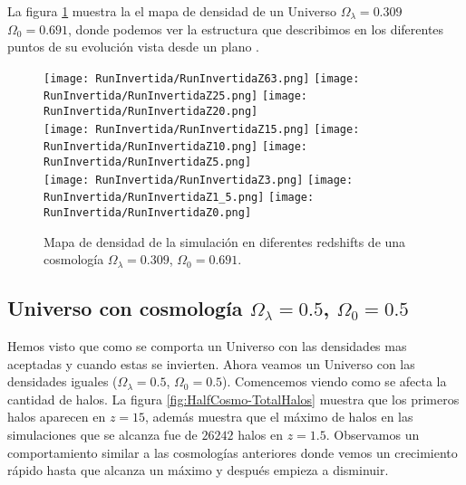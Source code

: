 La figura \ref{fig:Invertida-DensityMap} muestra la el mapa de densidad de un Universo $\Omega_\lambda = 0.309 $ $\Omega_0 = 0.691$, donde podemos ver la estructura que describimos  en los diferentes puntos de su evolución vista desde un plano .
\begin{figure}[H]
    \centering

    \texttt{[image: RunInvertida/RunInvertidaZ63.png]}   %
    \texttt{[image: RunInvertida/RunInvertidaZ25.png]}   %
    \texttt{[image: RunInvertida/RunInvertidaZ20.png]}   %
    \\
    \texttt{[image: RunInvertida/RunInvertidaZ15.png]}   %
    \texttt{[image: RunInvertida/RunInvertidaZ10.png]}   %
    \texttt{[image: RunInvertida/RunInvertidaZ5.png]}    %
    \\
    \texttt{[image: RunInvertida/RunInvertidaZ3.png]}    %
    \texttt{[image: RunInvertida/RunInvertidaZ1\_5.png]}  %
    \texttt{[image: RunInvertida/RunInvertidaZ0.png]}    %
    \caption[Mapa de densidad en en diferentes redshift]{ \footnotesize Mapa de densidad de la simulación en diferentes redshifts de una cosmología $\Omega_\lambda = 0.309 $, $\Omega_0 = 0.691$. }
    \label{fig:Invertida-DensityMap}
\end{figure}

\subsection{Universo con cosmología \texorpdfstring{$\Omega_\lambda = 0.5$, $\Omega_0 = 0.5$ }{Omega lambda = 0.5, Omega 0 = 0.5} }

Hemos visto que como se comporta un Universo con las densidades mas aceptadas y cuando estas se invierten. Ahora veamos un Universo con las densidades iguales ($\Omega_\lambda = 0.5$, $\Omega_0 = 0.5$). Comencemos viendo como se afecta la cantidad de halos. La figura \ref{fig:HalfCosmo-TotalHalos} muestra que los primeros halos aparecen en $z=15$, además muestra que el máximo de halos en las simulaciones que se alcanza fue de $26242$ halos en $z=1.5$. Observamos un comportamiento similar a las cosmologías anteriores donde vemos un crecimiento rápido hasta que alcanza un máximo y después empieza a disminuir.


